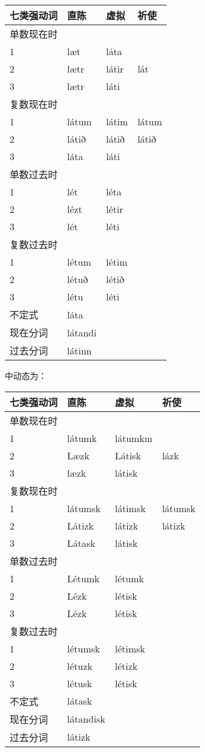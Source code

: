 \begin{longtable}{llll}
\toprule
七类强动词 & 直陈 & 虚拟 & 祈使 \\
\midrule
\endhead
\bottomrule
\endfoot
单数现在时 & & & \\
1 & læt & láta & \\
2 & lætr & látir & lát \\
3 & lætr & láti & \\
复数现在时 & & & \\
1 & látum & látim & látum \\
2 & látið & látið & látið \\
3 & láta & láti & \\
单数过去时 & & & \\
1 & lét & léta & \\
2 & lézt & létir & \\
3 & lét & léti & \\
复数过去时 & & & \\
1 & létum & létim & \\
2 & létuð & létið & \\
3 & létu & léti & \\
不定式 & láta & & \\
现在分词 & látandi & & \\
过去分词 & látinn & & \\
\end{longtable}

中动态为：

\begin{longtable}{llll}
\toprule
七类强动词 & 直陈 & 虚拟 & 祈使 \\
\midrule
\endhead
\bottomrule
\endfoot
单数现在时 & & & \\
1 & látumk & látumkm & \\
2 & Læzk & Látisk & lázk \\
3 & læzk & látisk & \\
复数现在时 & & & \\
1 & látumsk & látimsk & látumsk \\
2 & Látizk & látizk & látizk \\
3 & Látask & látisk & \\
单数过去时 & & & \\
1 & Létumk & létumk & \\
2 & Lézk & létisk & \\
3 & Lézk & létisk & \\
复数过去时 & & & \\
1 & létumsk & létimsk & \\
2 & létuzk & létizk & \\
3 & létusk & létisk & \\
不定式 & látask & & \\
现在分词 & látandisk & & \\
过去分词 & látizk & & \\
\end{longtable}

